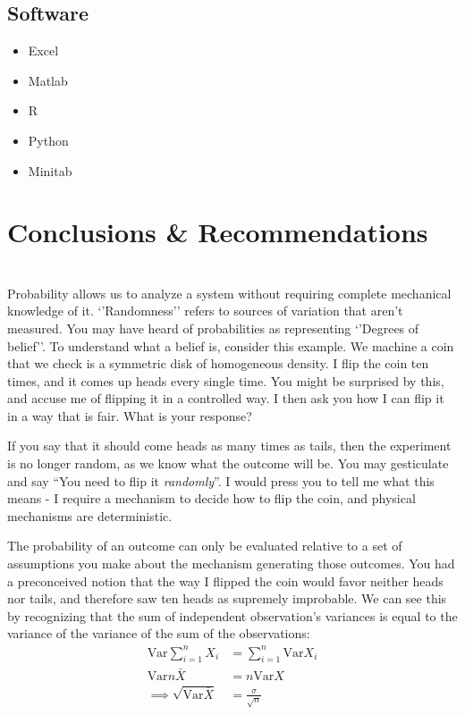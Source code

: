 \documentclass[11pt,a4paper,article]{memoir} %
\begin{document}
\section{Software}
\begin{itemize}
\item Excel
\item Matlab
\item R
\item Python
\item Minitab
\end{itemize}

\newpage


\chapter{Conclusions \& Recommendations}

\newpage
\appendix
\chapter{}
Probability allows us to analyze a system without requiring complete mechanical knowledge of it. `'Randomness'' refers to sources of variation that aren't measured. You may have heard of probabilities as representing `'Degrees of belief''. To understand what a belief is, consider this example. We machine a coin that we check is a symmetric disk of homogeneous density. I flip the coin ten times, and it comes up heads every single time. You might be surprised by this, and accuse me of flipping it in a controlled way. I then ask you how I can flip it in a way that is fair. What is your response?
\par
If you say that it should come heads as many times as tails, then the experiment is no longer random, as we know what the outcome will be. You may gesticulate and say ``You need to flip it \emph{randomly}''. I would press you to tell me what this means - I require a mechanism to decide how to flip the coin, and physical mechanisms are deterministic.
\par
The probability of an outcome can only be evaluated relative to a set of assumptions you make about the mechanism generating those outcomes. You had a preconceived notion that the way I flipped the coin would favor neither heads nor tails, and therefore saw ten heads as supremely improbable.
\newpage
We can see this by recognizing that the sum of independent observation's variances is equal to the variance of the variance of the sum of the observations:
\begin{align}
 \text{Var}\sum_{i = 1}^n X_i &= \sum_{i = 1}^n \text{Var}X_i\\
	\text{Var}n\bar{X} &= n\text{Var}X \\
	\implies \sqrt{\text{Var}\bar{X}} &= \frac{\sigma}{\sqrt{n}}
\end{align}
\end{document}
